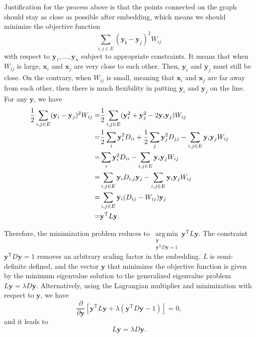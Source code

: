 Justification for the process above is that the points connected on the graph should stay as close as possible after embedding, which means we should minimize the objective function
\begin{equation}
	\sum_{i,j\in E}(\mathbf{y_i}-\mathbf{y}_j)^2W_{ij}
\end{equation}
with respect to $\mathbf{y}_1, \dots, \mathbf{y}_n$ subject to appropriate constraints. It means that when $W_{ij}$ is large, $\mathbf{x}_i$ and $\mathbf{x}_j$ are very close to each other. Then, $\mathbf{y}_i$ and $\mathbf{y}_j$ must still be close. On the contrary, when $W_{ij}$ is small, meaning that $\mathbf{x}_i$ and $\mathbf{x}_j$ are far away from each other, then there is much flexibility in putting $\mathbf{y}_i$ and $\mathbf{y}_j$ on the line. For any $\mathbf{y}$, we have
\begin{align}
	\frac{1}{2}\sum_{i,j\in E}(\mathbf{y}_i-\mathbf{y}_j)^2 W_{ij}=&\frac{1}{2}\sum_{i,j\in E}(\mathbf{y}_i^2+\mathbf{y}_j^2-2\mathbf{y}_i\mathbf{y}_j)W_{ij}\notag\\
	=&\frac{1}{2}\sum_{i}\mathbf{y}_i^2 D_{ii}+\frac{1}{2}\sum_j \mathbf{y}_j^2 D_{jj}-\sum_{i,j\in E}\mathbf{y}_i\mathbf{y}_j W_{ij}\notag\\
	=&\sum_i \mathbf{y}_i^2D_{ii} -\sum_{i,j\in E}\mathbf{y}_i\mathbf{y}_jW_{ij}\notag\\
	=&\sum_{i,j\in E}\mathbf{y}_iD_{i,j}\mathbf{y}_j-\sum_{i,j\in E}\mathbf{y}_i\mathbf{y}_jW_{ij}\notag\\
	=&\sum_{i,j\in E}\mathbf{y}_i(D_{ij}-W_{ij})\mathbf{y}_j\notag\\
	=&\mathbf{y}^{\operatorname{T}}L\mathbf{y}.
\end{align}

Therefore, the minimization problem reduces to $\operatorname*{arg\,min}\limits_{\substack{\mathbf{y}\\\mathbf{y}^{\operatorname{T}}D\mathbf{y}=1}} \mathbf{y}^{\operatorname{T}}L\mathbf{y}$. The constraint $\mathbf{y}^{\operatorname{T}}D\mathbf{y}=1$ removes an arbitrary scaling factor in the embedding. $L$ is semi-definite defined, and the vector $\mathbf{y}$ that minimizes the objective function is given by the minimum eigenvalue solution to the generalized eigenvalue problem $L\mathbf{y}=\lambda D\mathbf{y}$. Alternatively, using the Lagrangian multiplier and minimization with respect to $\mathbf{y}$, we have
\begin{equation}
	\frac{\partial}{\partial \mathbf{y}}\left[\mathbf{y}^{\operatorname{T}}L\mathbf{y}+\lambda\left(\mathbf{y}^{\operatorname{T}}D\mathbf{y}-1\right)\right]=0,
\end{equation}
and it leads to
\begin{equation}
	L\mathbf{y}=\lambda D\mathbf{y}.
\end{equation}

